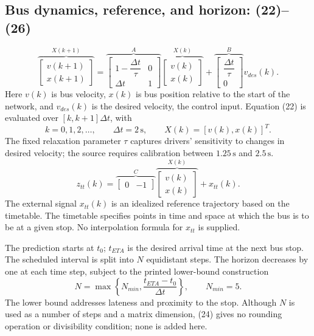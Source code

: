 \documentclass{article}
\begin{document}
\subsection*{Bus dynamics, reference, and horizon: (22)--(26)}
\begin{equation}
\overbrace{\begin{bmatrix}v(k+1)\\x(k+1)\end{bmatrix}}^{X(k+1)}
=
\overbrace{\begin{bmatrix}1-\dfrac{\Delta t}{\tau}&0\\\Delta t&1\end{bmatrix}}^{A}
\overbrace{\begin{bmatrix}v(k)\\x(k)\end{bmatrix}}^{X(k)}
+
\overbrace{\begin{bmatrix}\dfrac{\Delta t}{\tau}\\0\end{bmatrix}}^{B}
v_{des}(k).
\tag{22}
\end{equation}
Here \(v(k)\) is bus velocity, \(x(k)\) is bus position relative to the start of the network, and \(v_{des}(k)\) is the desired velocity, the control input. Equation (22) is evaluated over \([k,k+1]\Delta t\), with
\[
k=0,1,2,\ldots,\qquad \Delta t=2\,\mathrm{s},\qquad
X(k)=[v(k),x(k)]^T.
\]
The fixed relaxation parameter \(\tau\) captures drivers' sensitivity to changes in desired velocity; the source requires calibration between \(1.25\,\mathrm{s}\) and \(2.5\,\mathrm{s}\).
\begin{equation}
z_{tt}(k)=
\overbrace{\begin{bmatrix}0&-1\end{bmatrix}}^{C}
\overbrace{\begin{bmatrix}v(k)\\x(k)\end{bmatrix}}^{X(k)}
+x_{tt}(k).
\tag{23}
\end{equation}
The external signal \(x_{tt}(k)\) is an idealized reference trajectory based on the timetable. The timetable specifies points in time and space at which the bus is to be at a given stop. No interpolation formula for \(x_{tt}\) is supplied.

The prediction starts at \(t_0\); \(t_{ETA}\) is the desired arrival time at the next bus stop. The scheduled interval is split into \(N\) equidistant steps. The horizon decreases by one at each time step, subject to the printed lower-bound construction
\begin{equation}
N=\max\left\{N_{min},\frac{t_{ETA}-t_0}{\Delta t}\right\},
\qquad N_{min}=5.
\tag{24}
\end{equation}
The lower bound addresses lateness and proximity to the stop. Although \(N\) is used as a number of steps and a matrix dimension, (24) gives no rounding operation or divisibility condition; none is added here.
\end{document}
